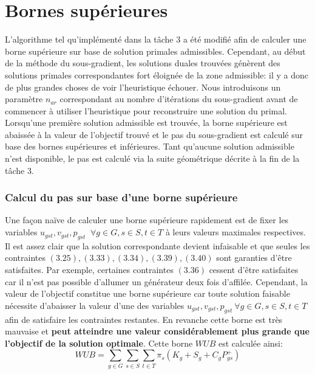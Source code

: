 \section{Bornes supérieures}

L'algorithme tel qu'implémenté dans la tâche 3 a été modifié afin de calculer une borne supérieure sur base de solution primales admissibles.
Cependant, au début de la méthode du sous-gradient, les solutions duales trouvées génèrent des solutions primales
correspondantes fort éloignée de la zone admissible: il y a donc de plus grandes choses de voir l'heuristique échouer.
Nous introduisons un paramètre \textit{$n_{ar}$} correspondant au nombre d'itérations du sous-gradient avant de commencer à utiliser
l'heuristique pour reconstruire une solution du primal. Lorsqu'une première solution admissible est trouvée, la borne supérieure est abaissée
à la valeur de l'objectif trouvé et le pas du sous-gradient est calculé sur base des bornes supérieures et inférieures.
Tant qu'aucune solution admissible n'est disponible, le pas est calculé via la suite géométrique décrite à la fin de la tâche 3.

\subsubsection{Calcul du pas sur base d'une borne supérieure}

Une façon naïve de calculer une borne supérieure rapidement est de fixer les variables
$u_{gst}, v_{gst}, p_{gst}$ $\ \forall g \in G, s \in S, t \in T$ à leurs valeurs maximales respectives.
Il est assez clair que la solution correspondante devient infaisable et que seules les contraintes 
$(3.25), (3.33), (3.34), (3.39), (3.40)$ sont garanties d'être satisfaites. Par exemple, certaines contraintes $(3.36)$ cessent d'être satisfaites
car il n'est pas possible d'allumer un générateur deux fois d'affilée. Cependant, la valeur de l'objectif constitue une borne supérieure
car toute solution faisable nécessite d'abaisser la valeur d'une des variables $u_{gst}, v_{gst}, p_{gst} \ \forall g \in G, s \in S, t \in T$
afin de satisfaire les contraintes restantes. En revanche cette borne est très mauvaise et \textbf{peut atteindre une valeur considérablement plus grande que l'objectif de la solution optimale}.
Cette borne $WUB$ est calculée ainsi:
\begin{equation}
    WUB = \sum\limits_{g \in G} \sum\limits_{s \in S} \sum\limits_{t \in T} \pi_s (K_g + S_g + C_g P_{gs}^{+})
\end{equation}

